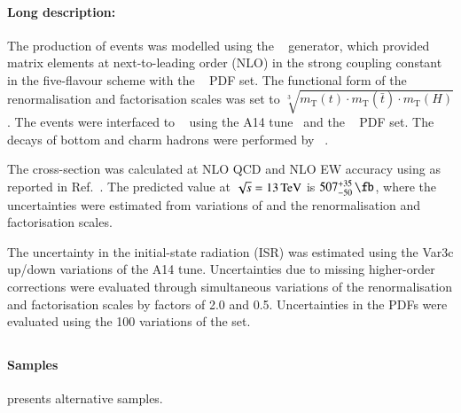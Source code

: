 \paragraph{Long description:}

The production of \ttH events was modelled using the
\POWHEGBOX[v2]~\cite{Frixione:2007nw,Nason:2004rx,Frixione:2007vw,Alioli:2010xd,Hartanto:2015uka}
generator, which provided matrix elements at next-to-leading order (NLO) in the strong coupling
constant \alphas in the five-flavour scheme with the \NNPDF[3.0nlo]~\cite{Ball:2014uwa} PDF set.
The functional form of the renormalisation and factorisation scales was
set to \(\sqrt[3]{m_\text{T}(t)\cdot m_\text{T}(\bar{t}) \cdot m_\text{T}(H)}\).
The events were interfaced to \PYTHIA[8.230]~\cite{Sjostrand:2014zea}
using the A14 tune~\cite{ATL-PHYS-PUB-2014-021} and the
\NNPDF[2.3lo]~\cite{Ball:2014uwa} PDF set. The decays of bottom and charm hadrons
were performed by \EVTGEN[1.6.0]~\cite{Lange:2001uf}.

The cross-section was calculated at NLO QCD and NLO EW accuracy using
\MGNLO as reported in Ref.~\cite{deFlorian:2016spz}.
The predicted value at \(\sqrt{s} = \SI{13}{\ensuremath{\text{TeV}}}\) is
\(507^{+35}_{-50}\,\si{\fb}\), where the uncertainties were estimated from
variations of \alphas and the renormalisation and factorisation scales.

The uncertainty in the initial-state radiation (ISR) was estimated using the Var3c
up/down variations of the A14 tune. Uncertainties due to missing
higher-order corrections were evaluated through simultaneous variations of the
renormalisation and factorisation scales by factors of
2.0 and 0.5. Uncertainties in the PDFs were evaluated using the 100
variations of the \NNPDF[3.0nlo] set.


\subsection[Powheg+Herwig7]{\POWHER[7]}

\paragraph{Samples}

 presents alternative \ttH samples.

